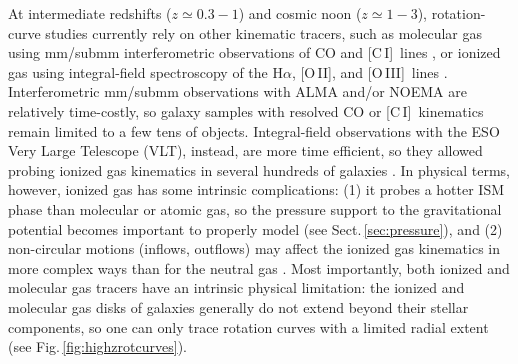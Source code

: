 \documentclass[a4paper,11pt]{article}
\newcommand{\ci } {[{\rm C}\,{\small\rm I}]}
\newcommand{\oii } {[{\rm O}\,{\small\rm II}]}
\newcommand{\oiii } {[{\rm O}\,{\small\rm III}]}
\begin{document}
At intermediate redshifts ($z\simeq0.3-1$) and cosmic noon ($z\simeq1-3$), rotation-curve studies currently rely on other kinematic tracers, such as molecular gas using mm/submm interferometric observations of CO and \ci\ lines \citep{Lelli2023, Rizzo2023, Lin2025}, or ionized gas using integral-field spectroscopy of the H$\alpha$, \oii, and \oiii\ lines \citep[e.g.,][]{DiTeodoro2016, DiTeodoro2018, Price2021, Puglisi2023}. Interferometric mm/submm observations with ALMA and/or NOEMA are relatively time-costly, so galaxy samples with resolved CO or \ci\ kinematics remain limited to a few tens of objects. Integral-field observations with the ESO Very Large Telescope (VLT), instead, are more time efficient, so they allowed probing ionized gas kinematics in several hundreds of galaxies \citep[e.g.,][]{Tiley2019, Nestor2023}. In physical terms, however, ionized gas has some intrinsic complications: (1) it probes a hotter ISM phase than molecular or atomic gas, so the pressure support to the gravitational potential becomes important to properly model (see Sect.\,\ref{sec:pressure}), and (2) non-circular motions (inflows, outflows) may affect the ionized gas kinematics in more complex ways than for the neutral gas \citep[e.g.,][]{Lelli2018}. Most importantly, both ionized and molecular gas tracers have an intrinsic physical limitation: the ionized and molecular gas disks of galaxies generally do not extend beyond their stellar components, so one can only trace rotation curves with a limited radial extent (see Fig.\,\ref{fig:highzrotcurves}). 
\end{document}
